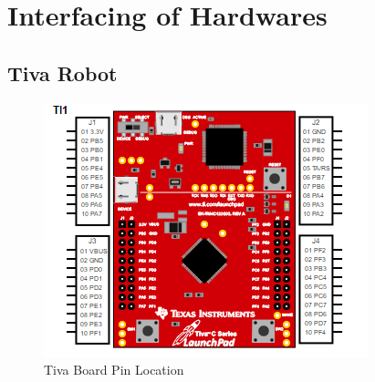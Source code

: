 \documentclass[a4paper,12pt,oneside]{book}
\begin{document}
 \section{Interfacing of Hardwares }
\subsection{Tiva Robot}

\begin{figure}[h]
	\centering
	\includegraphics[scale=1]{Tiva_pin}
	\caption{Tiva Board Pin Location}
\end{figure}
\end{document}
